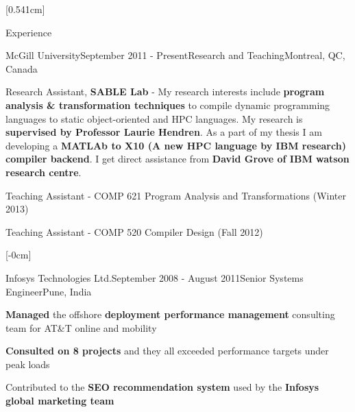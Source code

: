 \documentclass{resume} %
\begin{document}
[0.541cm]%
\begin{rSection}{Experience}
\begin{rSubsection}{McGill University}{September 2011 - Present}{Research and Teaching}{Montreal, QC, Canada}
\item Research Assistant, \textbf{SABLE Lab} - My research interests include \textbf{program analysis \& transformation techniques} to compile dynamic 
programming languages to static object-oriented and HPC languages. My research is \textbf{supervised by Professor Laurie Hendren}. As a part of my thesis 
I am developing a \textbf{MATLAb to X10 (A new HPC language by IBM research) compiler backend}. I get direct assistance from \textbf{David Grove of IBM watson research centre}.   
\item Teaching Assistant - COMP 621 Program Analysis and Transformations (Winter 2013) 
\item Teaching Assistant - COMP 520 Compiler Design (Fall 2012)

\end{rSubsection}

[-0cm]
\begin{rSubsection}{Infosys Technologies Ltd.}{September 2008 - August 2011}{Senior Systems Engineer}{Pune, India}
\item \textbf{Managed} the offshore \textbf{deployment performance management} consulting team for AT\&T online and mobility
\item \textbf{Consulted on 8 projects} and they all exceeded performance targets under peak loads
\item Contributed to the \textbf{SEO recommendation system} used by the \textbf{Infosys global marketing team}
\end{rSubsection}


\end{rSection}
\end{document}
